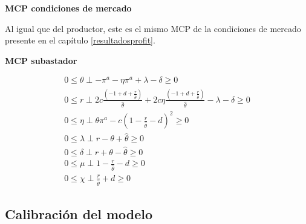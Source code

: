 \textbf{MCP condiciones de mercado}

Al igual que del productor, este es el mismo MCP de la condiciones de mercado presente en el capítulo \ref{resultadosprofit}.

\textbf{MCP subastador}

\begin{footnotesize}
\begin{align}
    0 \leq \theta \perp -\pi^a   - \eta\pi^a  + \lambda -  \delta \geq 0\\
   0 \leq r \perp 2c\frac{(-1+d+\frac{r}{\hat{\theta}})}{\hat{\theta}} + 2c\eta \frac{(-1+d+\frac{r}{\hat{\theta}})}{\hat{\theta}} - \lambda - \delta  \geq 0\\
0 \leq \eta \perp \theta \pi^a - c(1-\frac{r}{\hat{\theta}}-d)^2 \geq 0 \\
0 \leq \lambda \perp r - \theta + \hat{\theta} \geq 0 \\
0 \leq \delta \perp r + \theta - \hat{\theta} \geq 0\\
0 \leq \mu \perp 1-\frac{r}{\hat{\theta}}-d \geq 0\\
0 \leq\chi \perp \frac{r}{\hat{\theta}} + d \geq 0 
\end{align}
\end{footnotesize}

\subsection{Calibración del modelo}

